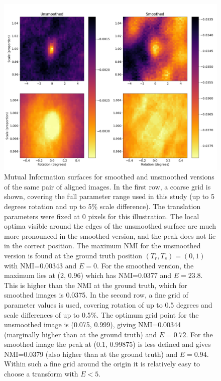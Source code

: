 \documentclass{report}
\begin{document}
\begin{figure}
\centering
\includegraphics[width=5.5in]{bothgrids_bothblur_im20.pdf}
\caption{Mutual Information surfaces for smoothed and unsmoothed versions of the same pair of aligned images. In the first row, a coarse grid is shown, covering the full parameter range used in this study (up to 5 degrees rotation and up to 5\% scale difference). The translation parameters were fixed at 0 pixels for this illustration. The local optima visible around the edges of the unsmoothed surface are much more pronounced in the smoothed version, and the peak does not lie in the correct position. The maximum NMI for the unsmoothed version is found at the ground truth position $(T_r, T_s) = (0, 1)$ with NMI=0.00343 and $E=0$. For the smoothed version, the maximum lies at (2, 0.96) which has NMI=0.0377 and $E=23.8$. This is higher than the NMI at the ground truth, which for smoothed images is 0.0375. In the second row, a fine grid of parameter values is used, covering rotation of up to 0.5 degrees and scale differences of up to 0.5\%. The optimum grid point for the unsmoothed image is (0.075, 0.999), giving NMI=0.00344 (marginally higher than at the ground truth) and $E=0.72$. For the smoothed image the peak at (0.1, 0.99875) is less defined and gives NMI=0.0379 (also higher than at the ground truth) and $E=0.94$. Within such a fine grid around the origin it is relatively easy to choose a transform with $E<5$. }
\label{fig:MI_surfaces}
\end{figure}
\end{document}
